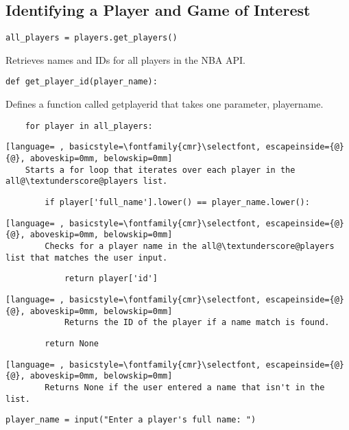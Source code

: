 \documentclass{article}
\begin{document}
\subsection{Identifying a Player and Game of Interest}
\begin{lstlisting}
all_players = players.get_players()
\end{lstlisting}
Retrieves names and IDs for all players in the NBA API.
\begin{lstlisting}
def get_player_id(player_name):
\end{lstlisting}
Defines a function called get\textunderscore player\textunderscore id that takes one parameter, player\textunderscore name.
\begin{lstlisting}
    for player in all_players:
\end{lstlisting}
\begin{lstlisting}[language= , basicstyle=\fontfamily{cmr}\selectfont, escapeinside={@}{@}, aboveskip=0mm, belowskip=0mm]
    Starts a for loop that iterates over each player in the all@\textunderscore@players list.
\end{lstlisting}
\begin{lstlisting}
        if player['full_name'].lower() == player_name.lower():
\end{lstlisting}
\begin{lstlisting}[language= , basicstyle=\fontfamily{cmr}\selectfont, escapeinside={@}{@}, aboveskip=0mm, belowskip=0mm]
        Checks for a player name in the all@\textunderscore@players list that matches the user input.
\end{lstlisting}
\begin{lstlisting}
            return player['id']
\end{lstlisting}
\begin{lstlisting}[language= , basicstyle=\fontfamily{cmr}\selectfont, escapeinside={@}{@}, aboveskip=0mm, belowskip=0mm]
            Returns the ID of the player if a name match is found.
\end{lstlisting}
\begin{lstlisting}
        return None
\end{lstlisting}
\begin{lstlisting}[language= , basicstyle=\fontfamily{cmr}\selectfont, escapeinside={@}{@}, aboveskip=0mm, belowskip=0mm]
        Returns None if the user entered a name that isn't in the list.
\end{lstlisting}
\begin{lstlisting}
player_name = input("Enter a player's full name: ")
\end{lstlisting}
\end{document}
